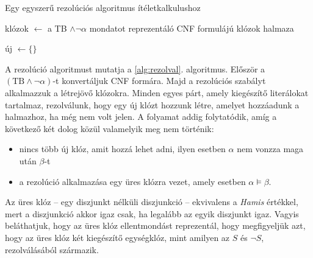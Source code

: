 \begin{algorithm}[H]
    \label{alg:rezolval}
    \caption{Egy egyszerű rezolúciós algoritmus ítéletkalkulushoz}
    \DontPrintSemicolon
    {

        klózok $\gets$ a TB $\land \lnot \alpha$ mondatot reprezentáló CNF formulájú klózok halmaza \;

        új  $\gets \{ \}$ \;

    }
\end{algorithm}

A rezolúció algoritmust mutatja a \ref{alg:rezolval}. algoritmus. Először a
$(\text{TB} \land \lnot \alpha)$-t konvertáljuk CNF formára. Majd a rezolúciós
szabályt alkalmazzuk a létrejövő klózokra. Minden egyes párt, amely kiegészítő
literálokat tartalmaz, rezolválunk, hogy egy új klózt hozzunk létre, amelyet
hozzáadunk a halmazhoz, ha még nem volt jelen. A folyamat addig folytatódik,
amíg a következő két dolog közül valamelyik meg nem történik:
\begin{itemize}
    \item nincs több új klóz, amit hozzá lehet adni, ilyen esetben $\alpha$ nem
        vonzza maga után  $\beta$-t
    \item a rezolúció alkalmazása egy üres klózra vezet, amely esetben $\alpha
        \models \beta$.
\end{itemize}

\begin{tetel}
    Az üres klóz -- egy diszjunkt nélküli diszjunkció -- ekvivalens a {\it
    Hamis} értékkel, mert a diszjunkció akkor igaz csak, ha legalább az egyik
    diszjunkt igaz. Vagyis beláthatjuk, hogy az üres klóz ellentmondást
    reprezentál, hogy megfigyeljük azt, hogy az üres klóz két kiegészítő
    egységklóz, mint amilyen az $S$ és $\lnot S$, rezolválásából származik.
\end{tetel}
